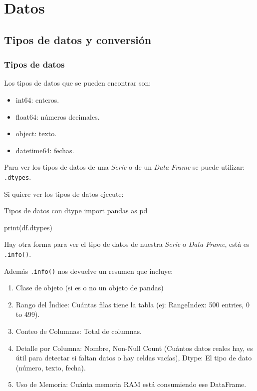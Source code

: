 \section{Datos}

\subsection{Tipos de datos y conversión}

\subsubsection{Tipos de datos}

Los tipos de datos que se pueden encontrar son:
\begin{itemize}
    \item int64: enteros.
    \item float64: números decimales.
    \item object: texto.
    \item datetime64: fechas.
\end{itemize}

Para ver los tipos de datos de una \textit{Serie} o de un \textit{Data Frame} se puede utilizar: \texttt{.dtypes}. 

Si quiere ver los tipos de datos ejecute:
\begin{pycode}{Tipos de datos con dtype}
import pandas as pd

print(df.dtypes)
\end{pycode}

Hay otra forma para ver el tipo de datos de nuestra \textit{Serie} o \textit{Data Frame}, está es \texttt{.info()}.

Además \texttt{.info()} nos devuelve un resumen que incluye:
\begin{enumerate}
    \item Clase de objeto (si es o no un objeto de pandas)
    \item Rango del Índice: Cuántas filas tiene la tabla (ej: RangeIndex: 500 entries, 0 to 499).
    \item Conteo de Columnas: Total de columnas.
    \item Detalle por Columna: Nombre, Non-Null Count (Cuántos datos reales hay, es útil para detectar si faltan datos o hay celdas vacías), Dtype: El tipo de dato (número, texto, fecha).
    \item Uso de Memoria: Cuánta memoria RAM está consumiendo ese DataFrame.
\end{enumerate}

